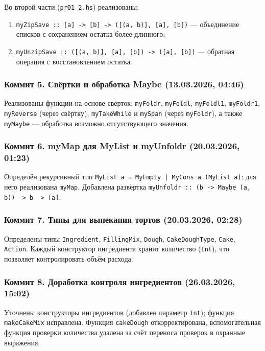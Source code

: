 \documentclass[a4paper, final]{article}
\begin{document}
Во второй части (\texttt{pr01\_2.hs}) реализованы:
\begin{enumerate}[label=\alph*),leftmargin=*]
  \item \texttt{myZipSave :: [a] -> [b] -> ([(a, b)], [a], [b])} — объединение
        списков с сохранением остатка более длинного;
  \item \texttt{myUnzipSave :: ([(a, b)], [a], [b]) -> ([a], [b])} — обратная
        операция с восстановлением остатка.
\end{enumerate}

\subsubsection{Коммит 5. Свёртки и обработка Maybe (13.03.2026, 04:46)}

Реализованы функции на основе свёрток: \texttt{myFoldr}, \texttt{myFoldl},
\texttt{myFoldl1}, \texttt{myFoldr1}, \texttt{myReverse} (через свёртку),
\texttt{myTakeWhile} и \texttt{mySpan} (через \texttt{myFoldr}), а также
\texttt{myMaybe} — обработка возможно отсутствующего значения.

\subsubsection{Коммит 6. myMap для MyList и myUnfoldr (20.03.2026, 01:23)}

Определён рекурсивный тип \texttt{MyList a = MyEmpty | MyCons a (MyList a)};
для него реализована \texttt{myMap}. Добавлена развёртка
\texttt{myUnfoldr :: (b -> Maybe (a, b)) -> b -> [a]}.

\subsubsection{Коммит 7. Типы для выпекания тортов (20.03.2026, 02:28)}

Определены типы \texttt{Ingredient}, \texttt{FillingMix}, \texttt{Dough},
\texttt{CakeDoughType}, \texttt{Cake}, \texttt{Action}. Каждый конструктор
ингредиента хранит количество (\texttt{Int}), что позволяет контролировать
объём расхода.

\subsubsection{Коммит 8. Доработка контроля ингредиентов (26.03.2026, 15:02)}

Уточнены конструкторы ингредиентов (добавлен параметр \texttt{Int}); функция
\texttt{makeCakeMix} исправлена. Функция \texttt{cakeDough} откорректирована,
вспомогательная функция проверки количества удалена за счёт переноса проверок
в охранные выражения.
\end{document}
